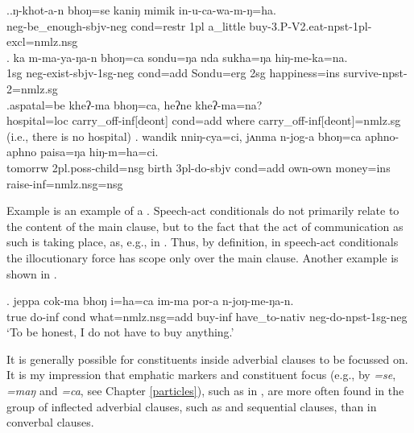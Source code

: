 \ex.\ag.\label{ex-ngkhotan}ŋ-khot-a-n  bhoŋ=se          kaniŋ   mimik    in-u-ca-wa-m-ŋ=ha.\\
{\sc neg-}be\_enough{\sc [3sg]-sbjv-neg} {\sc cond=restr} {\sc 1pl} a\_little buy{\sc -3.P-V2.eat-npst-1pl-excl=nmlz.nsg}\\
 
\bg. ka  m-ma-ya-ŋa-n bhoŋ=ca  sondu=ŋa    nda sukha=ŋa   hiŋ-me-ka=na.\\
{\sc 1sg} {\sc neg-}exist{\sc -sbjv-1sg-neg} {\sc cond=add} Sondu{\sc =erg} {\sc 2sg} happiness{\sc =ins} survive{\sc -npst-2=nmlz.sg}\\
 
\bg.aspatal=be     kheʔ-ma    bhoŋ=ca,       heʔne kheʔ-ma=na?\\
hospital{\sc =loc} carry\_off{\sc -inf[deont]} {\sc cond=add} where carry\_off{\sc -inf[deont]=nmlz.sg} \\
 (i.e., there is no hospital) 
\bg. wandik nniŋ-cya=ci, jʌnma n-jog-a bhoŋ=ca   aphno-aphno paisa=ŋa hiŋ-m=ha=ci.\\
tomorrw {\sc 2pl.poss-}child{\sc =nsg} birth  {\sc 3pl-}do{\sc -sbjv} {\sc cond=add} own-own money{\sc =ins} raise{\sc -inf=nmlz.nsg=nsg}\\
 

Example \Last[c] is an example of a  \citep[267]{Thompsonetal2007_Adverbial}. Speech-act conditionals do not primarily relate to the content of the main clause, but to the fact that the act of communication as such is taking place, as, e.g., in . Thus, by definition, in  speech-act conditionals the illocutionary force has scope only over the main clause. Another example is shown in \Next. 

\exg.	jeppa cok-ma  bhoŋ  i=ha=ca  im-ma  por-a  n-joŋ-me-ŋa-n.\\
		true  do{\sc -inf} {\sc cond}  what={\sc nmlz.nsg=add} buy{\sc -inf} have\_to{\sc -nativ} {\sc neg-}do{\sc -npst-1sg-neg}\\
		‘To be honest, I do not have to buy anything.’		

It is generally possible for constituents inside adverbial clauses to be focussed on. It is my impression that emphatic markers and constituent focus (e.g., by \emph{=se}, \emph{=maŋ} and \emph{=ca}, see Chapter \ref{particles}), such as in \Next, are more often found in the group of inflected adverbial clauses, such as  and sequential clauses, than in converbal clauses.

